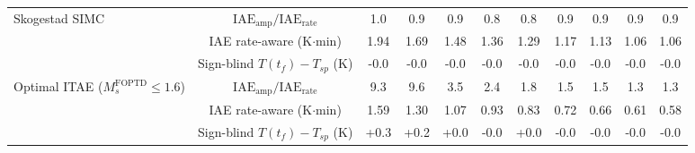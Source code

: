 \begin{table}[t]
{\begin{tabular}{lcccccccccc}
Skogestad SIMC & $\mathrm{IAE}_{\mathrm{amp}}/\mathrm{IAE}_{\mathrm{rate}}$ & 1.0 & 0.9 & 0.9 & 0.8 & 0.8 & 0.9 & 0.9 & 0.9 & 0.9 \\
 & IAE rate-aware (K$\cdot$min) & 1.94 & 1.69 & 1.48 & 1.36 & 1.29 & 1.17 & 1.13 & 1.06 & 1.06 \\
 & Sign-blind $T(t_f)-T_{sp}$ (K) & -0.0 & -0.0 & -0.0 & -0.0 & -0.0 & -0.0 & -0.0 & -0.0 & -0.0 \\
Optimal ITAE ($M_s^{\mathrm{FOPTD}} \leq 1.6$) & $\mathrm{IAE}_{\mathrm{amp}}/\mathrm{IAE}_{\mathrm{rate}}$ & 9.3 & 9.6 & 3.5 & 2.4 & 1.8 & 1.5 & 1.5 & 1.3 & 1.3 \\
 & IAE rate-aware (K$\cdot$min) & 1.59 & 1.30 & 1.07 & 0.93 & 0.83 & 0.72 & 0.66 & 0.61 & 0.58 \\
 & Sign-blind $T(t_f)-T_{sp}$ (K) & +0.3 & +0.2 & +0.0 & -0.0 & +0.0 & -0.0 & -0.0 & -0.0 & -0.0 \\
\bottomrule
\end{tabular}%
}
\end{table}
